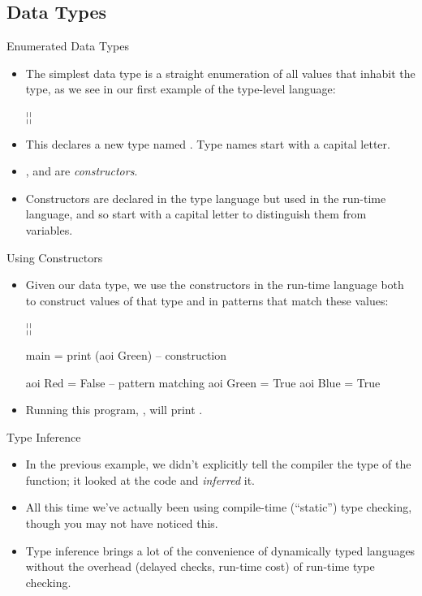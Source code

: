 \documentclass[xcolor=dvipsnames]{beamer}          %
\newcommand{\lH}[1]{\color{MidnightBlue}{#1}}
\newcommand{\lT}[1]{\color{Fuchsia}{#1}}        %
\begin{document}
\subsection{Data Types}

\begin{frame}[fragile]{Enumerated Data Types}
\begin{itemize}
    \item The simplest data type is a straight enumeration of all values
        that inhabit the type, as we see in our first example of the
        type-level language:
        \begin{hlisting}
            ¦\lT{data Color = Red | Green | Blue}¦
        \end{hlisting}
    \item This declares a new type named . Type names start
        with a capital letter.
    \item {},  and  are \emph{constructors}.
    \item Constructors are declared in the type language but used in
        the run-time language, and so start with a capital letter to
        distinguish them from variables.
\end{itemize}
\end{frame}


\begin{frame}[fragile]{Using Constructors}
\begin{itemize}
    \item Given our data type, we use the constructors in the run-time
        language both to construct values of that type and in patterns
        that match these values:
        \begin{hlisting}
            ¦\lT{data Color = Red | Green | Blue}¦

            main = print (aoi Green)    -- construction

            aoi Red   = False           -- pattern matching
            aoi Green = True
            aoi Blue  = True
        \end{hlisting}
    \item Running this program, , will print .
\end{itemize}
\end{frame}


\begin{frame}[fragile]{Type Inference}
\begin{itemize}
    \item In the previous example, we didn't explicitly tell the compiler
        the type of the \T{\lH{aoi}} function; it looked at the code
        and \emph{inferred} it.
    \item All this time we've actually been using compile-time
        (``static'') type checking, though you may not have noticed this.
    \item Type inference brings a lot of the convenience of dynamically
        typed languages without the overhead (delayed checks, run-time
        cost) of run-time type checking.
\end{itemize}
\end{frame}
\end{document}
